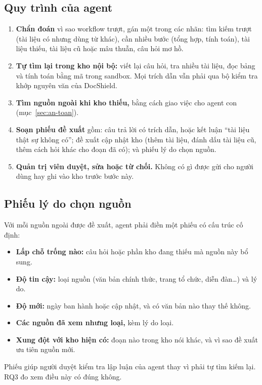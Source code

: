 \documentclass[11pt,a4paper]{article}
\begin{document}
\subsection{Quy trình của agent}
\begin{enumerate}
  \item \textbf{Chẩn đoán} vì sao workflow trượt, gán một trong các nhãn: tìm kiếm trượt (tài liệu có nhưng
        dùng từ khác), cần nhiều bước (tổng hợp, tính toán), tài liệu thiếu, tài liệu cũ hoặc mâu thuẫn,
        câu hỏi mơ hồ.
  \item \textbf{Tự tìm lại trong kho nội bộ:} viết lại câu hỏi, tra nhiều tài liệu, đọc bảng và tính toán
        bằng mã trong sandbox. Mọi trích dẫn vẫn phải qua bộ kiểm tra khớp nguyên văn của DocShield.
  \item \textbf{Tìm nguồn ngoài khi kho thiếu,} bằng cách giao việc cho agent con (mục~\ref{sec:an-toan}).
  \item \textbf{Soạn phiếu đề xuất} gồm: câu trả lời có trích dẫn, hoặc kết luận ``tài liệu thật sự không
        có''; đề xuất cập nhật kho (thêm tài liệu, đánh dấu tài liệu cũ, thêm cách hỏi khác cho đoạn đã có);
        và phiếu lý do chọn nguồn.
  \item \textbf{Quản trị viên duyệt, sửa hoặc từ chối.} Không có gì được gửi cho người dùng hay ghi vào kho
        trước bước này.
\end{enumerate}

\subsection{Phiếu lý do chọn nguồn}
Với mỗi nguồn ngoài được đề xuất, agent phải điền một phiếu có cấu trúc cố định:
\begin{itemize}
  \item \textbf{Lấp chỗ trống nào:} câu hỏi hoặc phần kho đang thiếu mà nguồn này bổ sung.
  \item \textbf{Độ tin cậy:} loại nguồn (văn bản chính thức, trang tổ chức, diễn đàn\ldots) và lý do.
  \item \textbf{Độ mới:} ngày ban hành hoặc cập nhật, và có văn bản nào thay thế không.
  \item \textbf{Các nguồn đã xem nhưng loại,} kèm lý do loại.
  \item \textbf{Xung đột với kho hiện có:} đoạn nào trong kho nói khác, và vì sao đề xuất ưu tiên nguồn mới.
\end{itemize}
Phiếu giúp người duyệt kiểm tra lập luận của agent thay vì phải tự tìm kiếm lại. RQ3 đo xem điều này có
đúng không.
\end{document}
